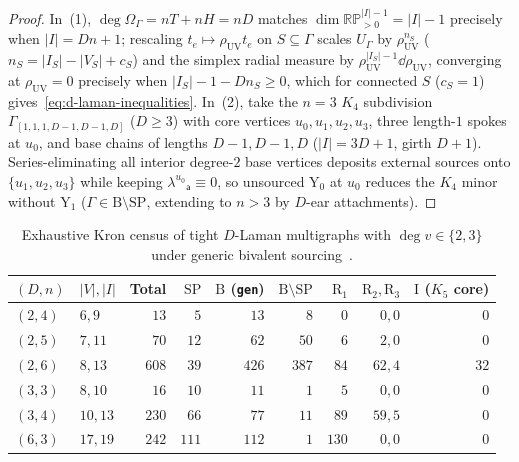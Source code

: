 \begin{proof}
In~(1), $\deg\Omega_\Gamma = nT + nH = nD$ matches $\dim\mathbb{RP}^{|I|-1}_{>0} = |I|-1$ precisely when $|I| = Dn+1$; rescaling $t_e \mapsto \rho_{\mathrm{UV}}t_e$ on $S \subseteq \Gamma$ scales $U_\Gamma$ by $\rho_{\mathrm{UV}}^{n_S}$ ($n_S = |I_S|-|V_S|+c_S$) and the simplex radial measure by $\rho_{\mathrm{UV}}^{|I_S|-1}\dd\rho_{\mathrm{UV}}$, converging at $\rho_{\mathrm{UV}} = 0$ precisely when $|I_S|-1 - Dn_S \ge 0$, which for connected $S$ ($c_S=1$) gives~\eqref{eq:d-laman-inequalities}. In~(2), take the $n=3$ $K_4$ subdivision $\Gamma_{[1,1,1,D-1,D-1,D]}$ ($D \ge 3$) with core vertices $u_0,u_1,u_2,u_3$, three length-$1$ spokes at $u_0$, and base chains of lengths $D-1, D-1, D$ ($|I|=3D+1$, girth $D+1$). Series-eliminating all interior degree-$2$ base vertices deposits external sources onto $\{u_1,u_2,u_3\}$ while keeping $\lambda^{u_0}{}_{\mathsf{a}} \equiv 0$, so unsourced $\mathrm{Y}_0$ at $u_0$ reduces the $K_4$ minor without $\mathrm{Y}_1$ ($\Gamma \in \mathrm{B}\setminus\mathrm{SP}$, extending to $n > 3$ by $D$-ear attachments).
\end{proof}

\begin{table}[H]
\centering
\scriptsize
\setlength{\tabcolsep}{4.5pt}
\renewcommand{\arraystretch}{1.14}
\begin{tabular}{@{}llrrrrrrr@{}}
\toprule
$(D,n)$ & $|V|, |I|$ & Total & $\mathrm{SP}$ & $\mathrm{B}$ (\texttt{gen}) & $\mathrm{B}\setminus\mathrm{SP}$ & $\mathrm{R}_1$ & $\mathrm{R}_2, \mathrm{R}_3$ & $\mathrm{I}$ ($K_5$ core) \\
\midrule
$(2,4)$ & $6, 9$ & $13$ & $5$ & $13$ & $8$ & $0$ & $0, 0$ & $0$ \\
$(2,5)$ & $7, 11$ & $70$ & $12$ & $62$ & $50$ & $6$ & $2, 0$ & $0$ \\
$(2,6)$ & $8, 13$ & $608$ & $39$ & $426$ & $387$ & $84$ & $62, 4$ & $32$ \\
$(3,3)$ & $8, 10$ & $16$ & $10$ & $11$ & $1$ & $5$ & $0, 0$ & $0$ \\
$(3,4)$ & $10, 13$ & $230$ & $66$ & $77$ & $11$ & $89$ & $59, 5$ & $0$ \\
$(6,3)$ & $17, 19$ & $242$ & $111$ & $112$ & $1$ & $130$ & $0, 0$ & $0$ \\
\bottomrule
\end{tabular}
\caption{Exhaustive Kron census of tight $D$-Laman multigraphs with $\deg v \in \{2,3\}$ under generic bivalent sourcing~\cite{Repo9e833c8}.}
\label{tab:laman-census}
\end{table}

